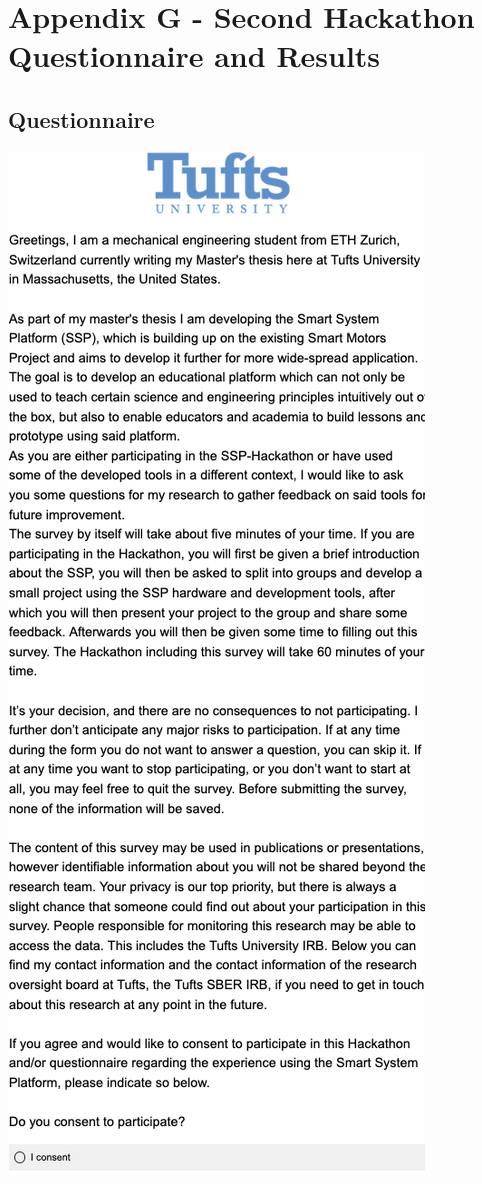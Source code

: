 \cleardoublepage%
\chapter*{\label{chap:apx_f}Appendix G - Second Hackathon Questionnaire and Results}%
%


\section*{Questionnaire}
\begin{multicols}{2}
\centering
\includegraphics[width=.75\linewidth]{overleaf/images/q1.png}\\

\end{multicols}
